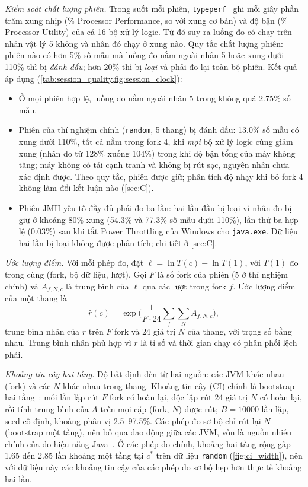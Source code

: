 \documentclass[12pt,a4paper]{article}
\begin{document}
\emph{Kiểm soát chất lượng phiên.} Trong suốt mỗi phiên, \texttt{typeperf}~\citep{typeperf} ghi mỗi giây phần trăm xung nhịp (\% Processor Performance, so với xung cơ bản) và độ bận (\% Processor Utility) của cả 16 bộ xử lý logic. Từ đó suy ra luồng đo có chạy trên nhân vật lý 5 không và nhân đó chạy ở xung nào. Quy tắc chất lượng phiên: phiên nào có hơn 5\% số mẫu mà luồng đo nằm ngoài nhân 5 hoặc xung dưới 110\% thì bị \emph{đánh dấu}; hơn 20\% thì bị \emph{loại} và phải đo lại toàn bộ phiên. Kết quả áp dụng (\cref{tab:session_quality,fig:session_clock}):
\begin{itemize}
\item Ở mọi phiên hợp lệ, luồng đo nằm ngoài nhân 5 trong không quá 2.75\% số mẫu.
\item Phiên của thí nghiệm chính (\texttt{random}, 5 thang) bị đánh dấu: 13.0\% số mẫu có xung dưới 110\%, tất cả nằm trong fork 4, khi \emph{mọi} bộ xử lý logic cùng giảm xung (nhân đo từ 128\% xuống 104\%) trong khi độ bận tổng của máy không tăng; máy không có tải cạnh tranh và không bị rút sạc, nguyên nhân chưa xác định được. Theo quy tắc, phiên được giữ; phân tích độ nhạy khi bỏ fork 4 không làm đổi kết luận nào (\cref{sec:C}).
\item Phiên JMH yếu tố đầy đủ phải đo ba lần: hai lần đầu bị loại vì nhân đo bị giữ ở khoảng 80\% xung (54.3\% và 77.3\% số mẫu dưới 110\%), lần thứ ba hợp lệ (0.03\%) sau khi tắt Power Throttling của Windows cho \texttt{java.exe}. Dữ liệu hai lần bị loại không được phân tích; chi tiết ở \cref{sec:C}.
\end{itemize}

\emph{Ước lượng điểm.} Với mỗi phép đo, đặt $\ell = \ln T(c) - \ln T(1)$, với $T(1)$ đo trong cùng (fork, bộ dữ liệu, lượt). Gọi $F$ là số fork của phiên (5 ở thí nghiệm chính) và $A_{f,N,c}$ là trung bình của $\ell$ qua các lượt trong fork $f$. Ước lượng điểm của một thang là
\begin{equation}
\hat r(c) = \exp\Big(\frac{1}{F \cdot 24} \sum_{f} \sum_{N} A_{f,N,c}\Big),
\end{equation}
trung bình nhân của $r$ trên $F$ fork và 24 giá trị $N$ của thang, với trọng số bằng nhau. Trung bình nhân phù hợp vì $r$ là tỉ số và thời gian chạy có phân phối lệch phải.

\emph{Khoảng tin cậy hai tầng.} Độ bất định đến từ hai nguồn: các JVM khác nhau (fork) và các $N$ khác nhau trong thang. Khoảng tin cậy (CI) chính là bootstrap hai tầng~\citep{efron1993,davison1997}: mỗi lần lặp rút $F$ fork có hoàn lại, độc lập rút 24 giá trị $N$ có hoàn lại, rồi tính trung bình của $A$ trên mọi cặp (fork, $N$) được rút; $B = \num{10000}$ lần lặp, seed cố định, khoảng phân vị 2.5--97.5\%. Các phép đo sơ bộ chỉ rút lại $N$ (bootstrap một tầng), nên bỏ qua dao động giữa các JVM, vốn là nguồn nhiễu chính của đo hiệu năng Java~\citep{georges2007,kalibera2013}. Ở các phép đo chính, khoảng hai tầng rộng gấp 1.65 đến 2.85 lần khoảng một tầng tại $c^*$ trên dữ liệu \texttt{random} (\cref{fig:ci_width}), nên với dữ liệu này các khoảng tin cậy của các phép đo sơ bộ hẹp hơn thực tế khoảng hai lần.
\end{document}
